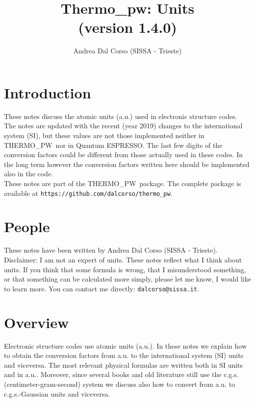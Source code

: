 \documentclass[12pt,a4paper]{article}
\def\version{1.4.0}
\def\qe{{\sc Quantum ESPRESSO}}
\def\tpw{{\sc THERMO\_PW}}
\begin{document}
 
\author{Andrea Dal Corso (SISSA - Trieste)}
\date{}


\title{
  \vskip 1cm
  {\color{red} \Huge Thermo\_pw: Units} \\
  \Large (version \version)
}

\maketitle

\newpage

\tableofcontents

\newpage

\section{\color{coral}Introduction}
These notes discuss the atomic units (a.u.) used in 
electronic structure codes. The notes are updated with the recent 
(year 2019) changes to the international system (SI), but these  
values are not those implemented neither in \tpw\ nor in \qe. The 
last few digits of the conversion factors could be different from 
those actually used in these codes. In the long term however the 
conversion factors written here should be implemented also in the code. \\
These notes are part of the \tpw\ package. The complete package is
available at \texttt{https://github.com/dalcorso/thermo\_pw}.

\newpage
\section{\color{coral}People}
These notes have been written by Andrea Dal Corso (SISSA - Trieste). \\
Disclaimer: I am not an expert of units. 
These notes reflect what I think about units.
If you think that some formula is wrong, that I misunderstood something, or 
that something can be calculated more simply, please let me know, I would 
like to learn more. 
You can contact me directly: \texttt{dalcorso@sissa.it}. 

\newpage
\section{\color{coral}Overview}
Electronic structure codes use atomic units (a.u.). 
In these notes we explain how to obtain the conversion factors 
from a.u. to the international system (SI) units and viceversa. 
The most relevant physical formulas are written both in SI units 
and in a.u.. Moreover, since several books and old literature still 
use the c.g.s. (centimeter-gram-second) system we discuss also how 
to convert from a.u. to c.g.s.-Gaussian units and viceversa.
\end{document}
